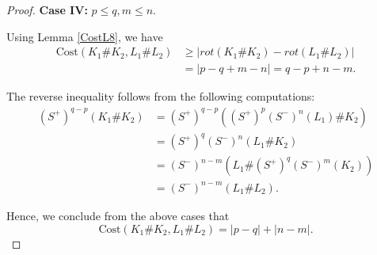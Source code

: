 \documentclass[10pt,a4paper]{amsart}
\newcommand{\Cost}{\text{Cost}}
\begin{document}
\begin{proof}
   
   \noindent \textbf{Case IV:} $p\leq q,m\leq n$.
   

      Using Lemma \ref{CostL8}, we have
\begin{align*}
    \Cost(K_1\#K_2,L_1\#L_2)&\geq |rot(K_1\#K_2)-rot(L_1\#L_2)|\\
    &=|p-q+m-n|=q-p+n-m.
\end{align*}

   The reverse inequality follows from the following computations:
\begin{align*}
       (S^+)^{q-p}(K_1\#K_2)&=(S^+)^{q-p}((S^+)^p(S^-)^n(L_1)\#K_2)\\
       &=(S^+)^q(S^-)^{n}(L_1\#K_2)\\
       &=(S^-)^{n-m}(L_1\#(S^+)^q(S^-)^m(K_2))\\
       &=(S^-)^{n-m}(L_1\#L_2).
   \end{align*}
  

   Hence, we conclude from the above cases that $$\Cost(K_1\#K_2,L_1\#L_2)=|p-q|+|n-m|.$$
\end{proof}
\end{document}
